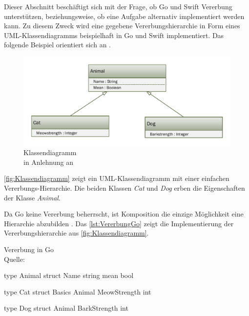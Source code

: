 Dieser Abschnitt beschäftigt sich mit der Frage, ob Go und Swift Vererbung unterstützen, beziehungsweise, ob eine Aufgabe alternativ implementiert werden kann.
Zu diesem Zweck wird eine gegebene Vererbungshierarchie in Form eines UML-Klassendiagramms beispielhaft in Go und Swift implementiert. 
Das folgende Beispiel orientiert sich an \cite[]{WilliamKennedy.2013}.

\begin{figure}[H]
    \centering
    \includegraphics[width=\textwidth]{Images/Klassendiagramm.pdf}
    \caption{Klassendiagramm \\ in Anlehnung an \cite[]{WilliamKennedy.2013}}
    \label{fig:Klassendiagramm}
\end{figure}

\autoref{fig:Klassendiagramm} zeigt ein UML-Klassendiagramm mit einer einfachen Vererbungs-Hierarchie.
Die beiden Klassen \emph{Cat} und \emph{Dog} erben die Eigenschaften der Klasse \emph{Animal}.


Da Go keine Vererbung beherrscht, ist Komposition die einzige Möglichkeit eine Hierarchie abzubilden \cite[]{Kennedy.2016}.
Das \autoref{lst:VererbungGo} zeigt die Implementierung der Vererbungshierarchie aus \autoref{fig:Klassendiagramm}.

\begin{listing}[H]
\caption{Vererbung in Go \\ Quelle:\cite{Kennedy.2016}}
\label{lst:VererbungGo}
\begin{GoCode}
type Animal struct {
    Name string
    mean bool
}

type Cat struct {
    Basics Animal
    MeowStrength int
}

type Dog struct {
    Animal
    BarkStrength int
}
\end{GoCode}
\end{listing}

